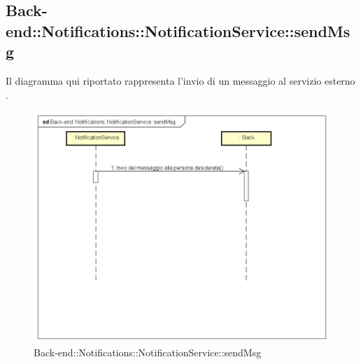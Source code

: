\subsection{Back-end::Notifications::NotificationService::sendMsg}
Il diagramma qui riportato rappresenta l'invio di un messaggio al servizio esterno .
 \begin{figure}[h] \centering \includegraphics[width=\textwidth,height=\textheight,keepaspectratio]{images/diagrams/back-end/Ufficial_Backend/Back-endNotificationsNotificationServicesendMsg.png} 	\caption{Back-end::Notifications::NotificationService::sendMsg} 
\end{figure}

\newpage


